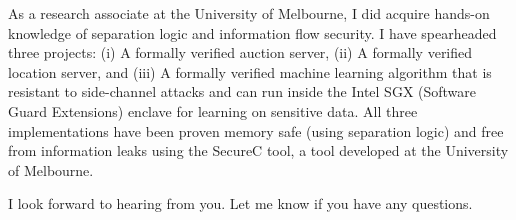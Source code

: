 \documentclass[11pt,a4paper,roman]{moderncv}
\begin{document}
As a research associate at the University of Melbourne, I did
 acquire hands-on knowledge of separation logic and information flow
 security. I have spearheaded three projects:
 (i) A formally verified auction server, (ii) A formally
 verified location server, and (iii) A formally verified machine learning 
 algorithm that is resistant to side-channel attacks and can  
 run inside the Intel SGX (Software Guard Extensions) enclave for learning
 on sensitive data. All three implementations have been proven 
 memory safe (using separation logic) and free from information
 leaks using the SecureC tool, a tool developed at the University of Melbourne.

\vspace{0.5cm}
I look forward to hearing from you. Let me know if you have any questions. \\
 

\vspace{0.5cm}


\makeletterclosing
\end{document}
